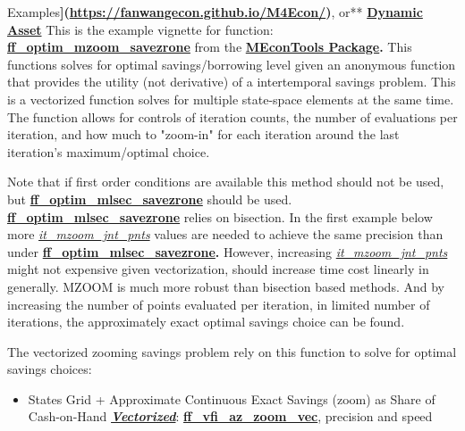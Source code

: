\documentclass[
]{book}
\providecommand{\tightlist}{%
  \setlength{\itemsep}{0pt}\setlength{\parskip}{0pt}}
\begin{document}
Examples\textbf{{]}(\url{https://fanwangecon.github.io/M4Econ/})}, or** \href{https://fanwangecon.github.io/CodeDynaAsset/}{\textbf{Dynamic
Asset}}
This is the example vignette for function:
\href{https://github.com/FanWangEcon//MEconTools/blob/master/MEconTools/optim/ff_optim_mzoom_savezrone.m}{\textbf{ff\_optim\_mzoom\_savezrone}}
from the \href{https://fanwangecon.github.io/MEconTools/}{\textbf{MEconTools
Package}}\textbf{.} This
functions solves for optimal savings/borrowing level given an anonymous
function that provides the utility (not derivative) of a intertemporal
savings problem. This is a vectorized function solves for multiple
state-space elements at the same time. The function allows for controls
of iteration counts, the number of evaluations per iteration, and how
much to "zoom-in" for each iteration around the last iteration's
maximum/optimal choice.

Note that if first order conditions are available this method should not
be used, but
\href{https://github.com/FanWangEcon//MEconTools/blob/master/MEconTools/optim/ff_optim_mlsec_savezrone.m}{\textbf{ff\_optim\_mlsec\_savezrone}}
should be used.
\href{https://github.com/FanWangEcon//MEconTools/blob/master/MEconTools/optim/ff_optim_mlsec_savezrone.m}{\textbf{ff\_optim\_mlsec\_savezrone}}
relies on bisection. In the first example below more
\underline{\emph{it\_mzoom\_jnt\_pnts}} values are needed to achieve the same
precision than under
\href{https://github.com/FanWangEcon//MEconTools/blob/master/MEconTools/optim/ff_optim_mlsec_savezrone.m}{\textbf{ff\_optim\_mlsec\_savezrone}}\textbf{.}
However, increasing \underline{\emph{it\_mzoom\_jnt\_pnts}} might not expensive given
vectorization, should increase time cost linearly in generally. MZOOM is
much more robust than bisection based methods. And by increasing the
number of points evaluated per iteration, in limited number of
iterations, the approximately exact optimal savings choice can be found.

The vectorized zooming savings problem rely on this function to solve
for optimal savings choices:

\begin{itemize}
\tightlist
\item
  States Grid + Approximate Continuous Exact Savings (zoom) as Share
  of Cash-on-Hand \underline{\textbf{\emph{Vectorized}}}:
  \href{https://github.com/FanWangEcon/MEconTools/blob/master/MEconTools/vfi/ff_vfi_az_zoom_vec.m}{\textbf{ff\_vfi\_az\_zoom\_vec}},
  precision and speed
\end{itemize}
\end{document}
